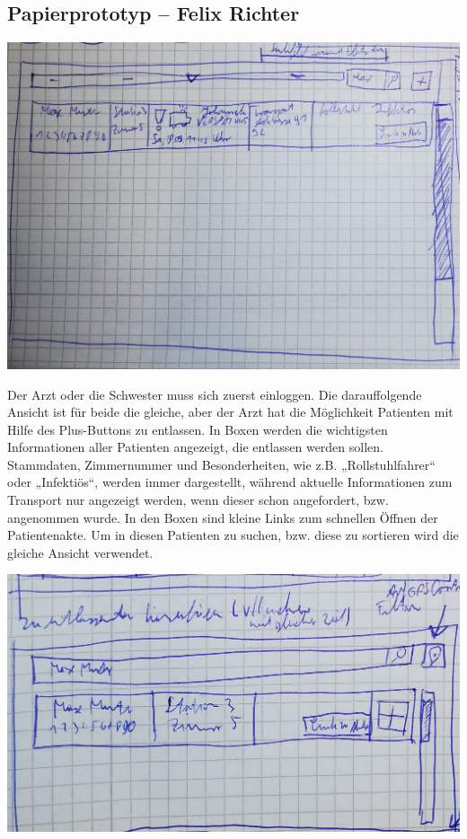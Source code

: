 \documentclass[a4paper, ngerman, 12pt]{scrartcl}
\begin{document}
\subsection{Papierprototyp – Felix Richter}
\begin{center}
\begin{minipage}[b]{0.7\textwidth}
	\centering
	\includegraphics[width=\textwidth]{Bilder/uebersicht.jpg}
	\label{img:richter1}
\end{minipage}
\end{center}
Der Arzt oder die Schwester muss sich zuerst einloggen. Die darauffolgende Ansicht ist für beide die gleiche, aber der Arzt hat die Möglichkeit Patienten mit Hilfe des Plus-Buttons zu entlassen. In Boxen werden die wichtigsten Informationen aller Patienten angezeigt, die entlassen werden sollen. Stammdaten, Zimmernummer und Besonderheiten, wie z.B. „Rollstuhlfahrer“ oder „Infektiös“, werden immer dargestellt, während aktuelle Informationen zum Transport nur angezeigt werden, wenn dieser schon angefordert, bzw. angenommen wurde. In den Boxen sind kleine Links zum schnellen Öffnen der Patientenakte. Um in diesen Patienten zu suchen, bzw. diese zu sortieren wird die gleiche Ansicht verwendet.\\
\begin{center}
\begin{minipage}[b]{0.8\textwidth}
	\centering
	\includegraphics[width=\textwidth]{Bilder/hinzufuegen.jpg}
	\label{img:richter2}
\end{minipage}
\end{center}
\end{document}
